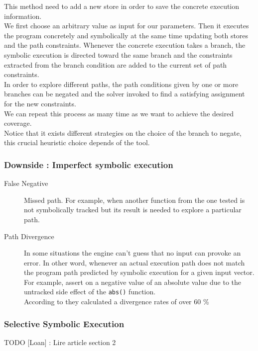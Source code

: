 \documentclass[11pt]{article}
\begin{document}
    			This method need to add a new store in order to save the concrete execution information.\\
    			We first choose an arbitrary value as input for our parameters. Then it executes the program concretely and symbolically at the same time updating both stores and the path constraints. Whenever the concrete execution takes a branch, the symbolic execution is directed toward the same branch and the constraints extracted from the branch condition are added to the current set of path constraints.\\
    			In order to explore different paths, the path conditions given by one or more branches can be negated and the solver invoked to find a satisfying assignment for the new constraints.\\
    			We can repeat this process as many time as we want to achieve the desired coverage.\\
    			
    			Notice that it exists different strategies on the choice of the branch to negate, this crucial heuristic choice depends of the tool.\\
    		
    		\subsubsection*{Downside : Imperfect symbolic execution}
    			\begin{description}
    				\item[False Negative] Missed path. For example, when another function from the one tested is not symbolically tracked but its result is needed to explore a particular path.
    				\item[Path Divergence] In some situations the engine can't guess that no input can provoke an error. In other word, whenever an actual execution path does not match the program path predicted by symbolic execution for a given input vector. For example, assert on a negative value of an absolute value due to the untracked side effect of the \texttt{abs()} function.\\
    				According to \cite{Godefroid2008AutomatedWF} they calculated a divergence rates of over 60 \%
    			\end{description}
    			
    	\subsubsection{Selective Symbolic Execution}
    	\label{subsec:selectiveSymbolicExec}
    		TODO [Loan] : Lire article \cite{chipounov2012s2e} section 2
\end{document}

